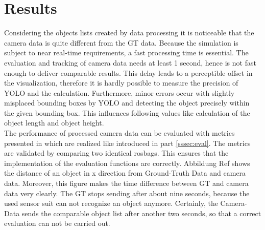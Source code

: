 \section{Results}\label{Results}

	Considering the objects lists created by data processing it is noticeable that the camera data is quite different from the \ac{GT} data. Because the simulation is subject to near real-time requirements, a fast processing time is essential. The evaluation and tracking of camera data needs at least 1 second, hence is not fast enough to deliver comparable results. This delay leads to a perceptible offset in the visualization, therefore it is hardly possible to measure the precision of \ac{YOLO} and the calculation.
	Furthermore, minor errors occur with slightly misplaced bounding boxes by \ac{YOLO} and detecting the object precisely within the given bounding box. This influences following values like calculation of the object length and object height.\\
	
	The performance of processed camera data can be evaluated with metrics presented in \cite{Reway} which are realized like introduced in part \ref{sssec:eval}. The metrics are validated by comparing two identical rosbags. This ensures that the implementation of the evaluation functions are correctly. Abbildung Ref shows the distance of an object in x direction from Ground-Truth Data and camera data. Moreover, this figure  makes the time difference between GT and camera data very clearly. The GT stops sending after about nine seconds, because the used sensor suit  can not recognize an object anymore. Certainly, the Camera-Data  sends the comparable object list after another two seconds, so that a correct evaluation can not be carried out. 
	
%	
